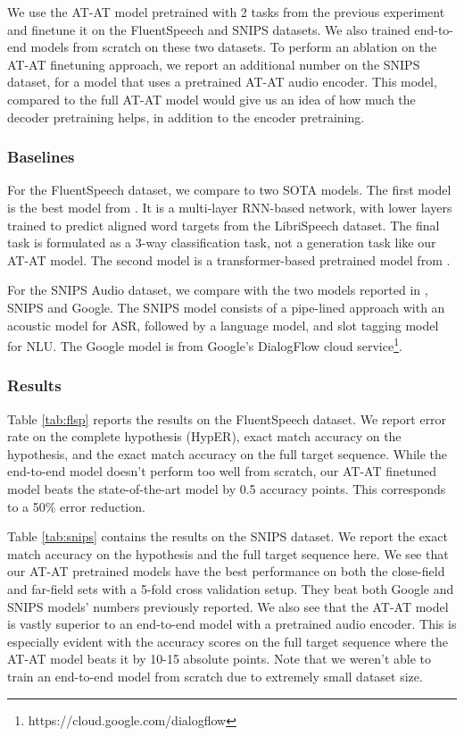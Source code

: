 \documentclass[letterpaper]{article} \usepackage{aaai21}  \usepackage{times}  \usepackage{helvet} \usepackage{courier}  \usepackage[hyphens]{url}  \usepackage{graphicx} \usepackage{booktabs}
\begin{document}
We use the AT-AT model pretrained with 2 tasks from the previous experiment and finetune it on the FluentSpeech and SNIPS datasets. We also trained end-to-end models from scratch on these two datasets. To perform an ablation on the AT-AT finetuning approach, we report an additional number on the SNIPS dataset, for a model that uses a pretrained AT-AT audio encoder. This model, compared to the full AT-AT model would give us an idea of how much the decoder pretraining helps, in addition to the encoder pretraining.

\subsubsection{Baselines}
For the FluentSpeech dataset, we compare to two SOTA models. The first model is the best model from \cite{Lugosch2019SpeechMP}. It is a multi-layer RNN-based network, with lower layers trained to predict aligned word targets from the LibriSpeech dataset. The final task is formulated as a 3-way classification task, not a generation task like our AT-AT model. The second model is a transformer-based pretrained model from \cite{wang2020large}.

For the SNIPS Audio dataset, we compare with the two models reported in \cite{Saade2018SpokenLU}, SNIPS and Google. The SNIPS model consists of a pipe-lined approach with an acoustic model for ASR, followed by a language model, and slot tagging model for NLU. The Google model is from Google's DialogFlow cloud service\footnote{https://cloud.google.com/dialogflow}.

\subsubsection{Results}
Table \ref{tab:flsp} reports the results on the FluentSpeech dataset. We report error rate on the complete hypothesis (HypER), exact match accuracy on the hypothesis, and the exact match accuracy on the full target sequence. While the end-to-end model doesn't perform too well from scratch, our AT-AT finetuned model beats the state-of-the-art model by 0.5 accuracy points. This corresponds to a 50\% error reduction.

Table \ref{tab:snips} contains the results on the SNIPS dataset. We report the exact match accuracy on the hypothesis and the full target sequence here. We see that our AT-AT pretrained models have the best performance on both the close-field and far-field sets with a 5-fold cross validation setup. They beat both Google and SNIPS models' numbers previously reported. We also see that the AT-AT model is vastly superior to an end-to-end model with a pretrained audio encoder. This is especially evident with the accuracy scores on the full target sequence where the AT-AT model beats it by 10-15 absolute points. Note that we weren't able to train an end-to-end model from scratch due to extremely small dataset size.
\end{document}
